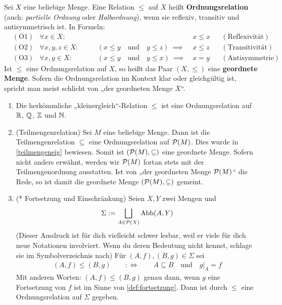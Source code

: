 \begin{defin}[Ordnungsrelationen] \label{def:ordnungsrelation}    
    Sei $X$ eine beliebige Menge. Eine Relation $\le$ auf $X$ heißt \textbf{Ordnungsrelation} (auch: \emph{partielle Ordnung} oder \emph{Halbordnung}), wenn sie reflexiv, transitiv und antisymmetrisch ist. In Formeln:
    \begin{align*}
        & (\text{O1}) & \forall x\in X:&&\quad &x\le x && (\text{Reflexivität}) \\
        & (\text{O2}) & \forall x,y,z\in X:&&\quad (x\le y\quad \text{und}\quad y\le z)\ \implies\ & x\le z && (\text{Transitivität}) \\
        & (\text{O3}) & \forall x,y\in X:&&\quad  (x\le y\quad \text{und}\quad y\le x)\ \implies\ & x=y && (\text{Antisymmetrie})
    \end{align*}
    Ist $\le$ eine Ordnungsrelation auf $X$, so heißt das Paar $(X,\le)$ eine \textbf{geordnete Menge}. Sofern die Ordnungsrelation im Kontext klar oder gleichgültig ist, spricht man meist schlicht von „der geordneten Menge $X$“.
\end{defin}


\begin{bsp} \quad
    \begin{enumerate}
        \item Die herkömmliche „kleinergleich“-Relation $\le$ ist eine Ordnungsrelation auf $\mathbb R$, $\mathbb Q$, $\mathbb Z$ und $\mathbb N$.
        \item(Teilmengenrelation) Sei $M$ eine beliebige Menge. Dann ist die Teilmengenrelation $\subseteq$ eine Ordnungsrelation auf $\mathcal P(M)$. Dies wurde in \cref{teilmengeneig} bewiesen. Somit ist $(\mathcal P(M),\subseteq)$ eine geordnete Menge. Sofern nicht anders erwähnt, werden wir $\mathcal P(M)$ fortan stets mit der Teilmengenordnung ausstatten. Ist von „der geordneten Menge $\mathcal P(M)$“ die Rede, so ist damit die geordnete Menge $(\mathcal P(M),\subseteq)$ gemeint.
        \item(* Fortsetzung und Einschränkung) Seien $X,Y$ zwei Mengen und
            \[ \Sigma := \bigsqcup_{A\in \mathcal P(X)} \operatorname{Abb}(A,Y) \]
        (Dieser Ausdruck ist für dich vielleicht schwer lesbar, weil er viele für dich neue Notationen involviert. Wenn du deren Bedeutung nicht kennst, schlage sie im Symbolverzeichnis nach)
        Für $(A,f),(B,g)\in\Sigma$ sei
        \begin{align*}
            (A,f) \le (B,g) \qquad:\Leftrightarrow\qquad A\subseteq B\quad \text{und}\quad g\vert_A=f
        \end{align*}
        Mit anderen Worten: $(A,f)\le (B,g)$ genau dann, wenn $g$ eine Fortsetzung von $f$ ist im Sinne von \cref{def:fortsetzung}. Dann ist durch $\le$ eine Ordnungsrelation auf $\Sigma$ gegeben.
    \end{enumerate}
\end{bsp}


